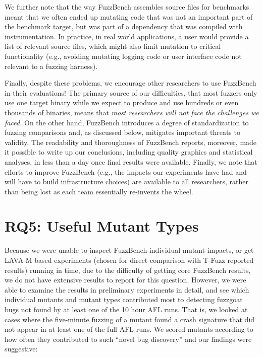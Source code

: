 We further note that the way FuzzBench assembles source files for benchmarks meant that we often ended up mutating code that was not an important part of the benchmark target, but was part of a dependency that was compiled with instrumentation.  In practice, in real world applications, a user would provide a list of relevant source files, which might also limit mutation to critical functionality (e.g., avoiding mutating logging code or user interface code not relevant to a fuzzing harness).

Finally, despite these problems, we encourage other researchers to use FuzzBench in their evaluations!  The primary source of our difficulties, that most fuzzers only use one target binary while we expect to produce and use hundreds or even thousands of binaries, means that \emph{most researchers will not face the challenges we faced.}  On the other hand, FuzzBench introduces a degree of standardization to fuzzing comparisons and, as discussed below, mitigates important threats to validity.  The readability and thoroughness of FuzzBench reports, moreover, made it possible to write up our conclusions, including quality graphics and statistical analyses, in less than a day once final results were available.  Finally, we note that efforts to improve FuzzBench (e.g., the impacts our experiments have had and will have to build infrastructure choices) are available to all researchers, rather than being lost as each team essentially re-invents the wheel.

\section{RQ5: Useful Mutant Types}

Because we were unable to inspect FuzzBench individual mutant impacts, or get LAVA-M based experiments (chosen for direct comparison with T-Fuzz reported results) running in time, due to the difficulty of getting core FuzzBench results, we do not have extensive results to report for this question.  However, we were able to examine the results in preliminary experiments in detail, and see which individual mutants and mutant types contributed most to detecting fuzzgoat bugs not found by at least one of the 10 hour AFL runs.  That is, we looked at cases where the five-minute fuzzing of a mutant found a crash signature that did not appear in at least one of the full AFL runs.  We scored mutants according to how often they contributed to such ``novel bug discovery'' and our findings were suggestive:


